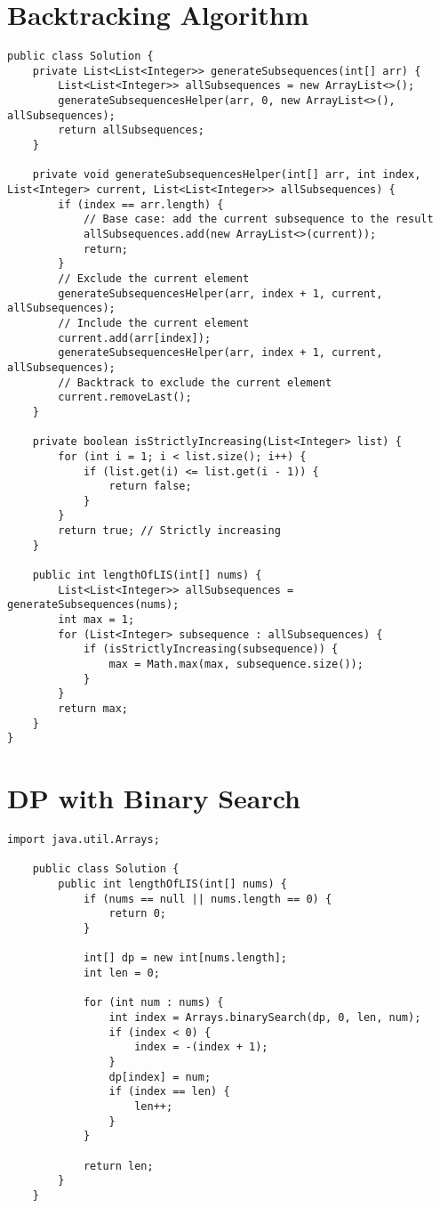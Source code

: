 \documentclass{article}
\begin{document}
\clearpage %
    \section{Backtracking Algorithm}
    \begin{lstlisting}[caption=$\mathcal{O}(2^{n})$ Backtracking Algorithm]
public class Solution {
	private List<List<Integer>> generateSubsequences(int[] arr) {
		List<List<Integer>> allSubsequences = new ArrayList<>();
		generateSubsequencesHelper(arr, 0, new ArrayList<>(), allSubsequences);
		return allSubsequences;
	}
	
	private void generateSubsequencesHelper(int[] arr, int index, List<Integer> current, List<List<Integer>> allSubsequences) {
		if (index == arr.length) {
			// Base case: add the current subsequence to the result
			allSubsequences.add(new ArrayList<>(current));
			return;
		}		
		// Exclude the current element
		generateSubsequencesHelper(arr, index + 1, current, allSubsequences);		
		// Include the current element
		current.add(arr[index]);
		generateSubsequencesHelper(arr, index + 1, current, allSubsequences);		
		// Backtrack to exclude the current element
		current.removeLast();
	}
	
	private boolean isStrictlyIncreasing(List<Integer> list) {
		for (int i = 1; i < list.size(); i++) {
			if (list.get(i) <= list.get(i - 1)) {
				return false;
			}
		}
		return true; // Strictly increasing
	}
	
    public int lengthOfLIS(int[] nums) {
    	List<List<Integer>> allSubsequences = generateSubsequences(nums);
    	int max = 1;
    	for (List<Integer> subsequence : allSubsequences) {
    		if (isStrictlyIncreasing(subsequence)) {
    			max = Math.max(max, subsequence.size());
    		}
    	}
    	return max;
    }
}
    \end{lstlisting}

\clearpage %
    \section{DP with Binary Search}
    \begin{lstlisting}[caption=$\mathcal{O}(n\log_{}{n})$ DP with Binary Search]
	import java.util.Arrays;

	public class Solution {
		public int lengthOfLIS(int[] nums) {
			if (nums == null || nums.length == 0) {
				return 0;
			}

			int[] dp = new int[nums.length];
			int len = 0;

			for (int num : nums) {
				int index = Arrays.binarySearch(dp, 0, len, num);
				if (index < 0) {
					index = -(index + 1);
				}
				dp[index] = num;
				if (index == len) {
					len++;
				}
			}

			return len;
		}
	}
    \end{lstlisting}
\end{document}

